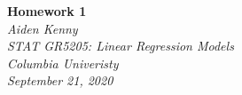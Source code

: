 \documentclass[10pt]{article}
\begin{document}
\newcommand{\mytitle}{Homework 1}
\newcommand{\myauthor}{Aiden Kenny}
\newcommand{\myclass}{STAT GR5205: Linear Regression Models}
\newcommand{\myschool}{Columbia Univeristy}
\newcommand{\mydate}{September 21, 2020}
\begin{flushright}
    \textbf{\mytitle}\\[0.5em]
    \textsl{\myauthor}\\
    \textsl{\myclass}\\
    \textsl{\myschool}\\
    \textsl{\mydate}
\end{flushright} \vspace{1em}

\end{document}
